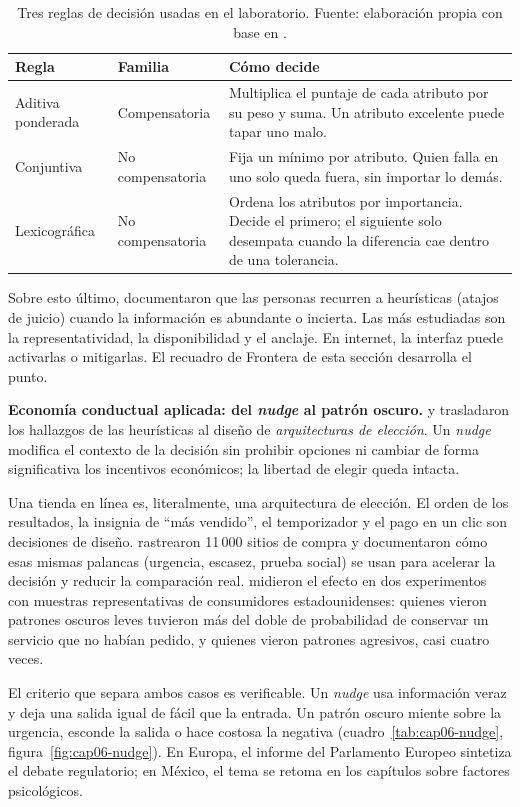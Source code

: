 \begin{table}[!htb]
\centering
\begin{tabular}{@{}p{2.8cm}p{3.5cm}p{6.2cm}@{}}
\toprule
Regla & Familia & Cómo decide \\
\midrule
Aditiva ponderada & Compensatoria & Multiplica el puntaje de cada atributo por su peso y suma. Un atributo excelente puede tapar uno malo. \\
Conjuntiva & No compensatoria & Fija un mínimo por atributo. Quien falla en uno solo queda fuera, sin importar lo demás. \\
Lexicográfica & No compensatoria & Ordena los atributos por importancia. Decide el primero; el siguiente solo desempata cuando la diferencia cae dentro de una tolerancia. \\
\bottomrule
\end{tabular}
\caption{Tres reglas de decisión usadas en el laboratorio. Fuente: elaboración
propia con base en \textcite{payne1988adaptive}.}
\label{tab:cap06-reglas}
\end{table}

Sobre esto último, \textcite{tverskykahneman1974} documentaron que las
personas recurren a heurísticas (atajos de juicio) cuando la información es
abundante o incierta. Las más estudiadas son la representatividad, la
disponibilidad y el anclaje. En internet, la interfaz puede activarlas o
mitigarlas. El recuadro de Frontera de esta sección desarrolla el punto.

\begin{cajaFrontera}
\textbf{Economía conductual aplicada: del \textit{nudge} al patrón oscuro.}
\textcite{thaler2003libertarian} y \textcite{thalersunstein2008} trasladaron
los hallazgos de las heurísticas al diseño de \emph{arquitecturas de
elección}. Un \textit{nudge} modifica el contexto de la decisión sin
prohibir opciones ni cambiar de forma significativa los incentivos
económicos; la libertad de elegir queda intacta.

Una tienda en línea es, literalmente, una arquitectura de elección. El orden
de los resultados, la insignia de \enquote{más vendido}, el temporizador y el
pago en un clic son decisiones de diseño. \textcite{mathur2019} rastrearon
11\,000 sitios de compra y documentaron cómo esas mismas palancas
(urgencia, escasez, prueba social) se usan para acelerar la decisión y
reducir la comparación real. \textcite{luguristrahilevitz2021} midieron el
efecto en dos experimentos con muestras representativas de consumidores
estadounidenses: quienes vieron patrones oscuros leves tuvieron más del doble
de probabilidad de conservar un servicio que no habían pedido, y quienes
vieron patrones agresivos, casi cuatro veces.

El criterio que separa ambos casos es verificable. Un \textit{nudge} usa
información veraz y deja una salida igual de fácil que la entrada. Un patrón
oscuro miente sobre la urgencia, esconde la salida o hace costosa la
negativa (cuadro~\ref{tab:cap06-nudge}, figura~\ref{fig:cap06-nudge}). En
Europa, el informe del Parlamento Europeo \parencite{eprs2025darkpatterns}
sintetiza el debate regulatorio; en México, el tema se retoma en los
capítulos sobre factores psicológicos.
\end{cajaFrontera}

